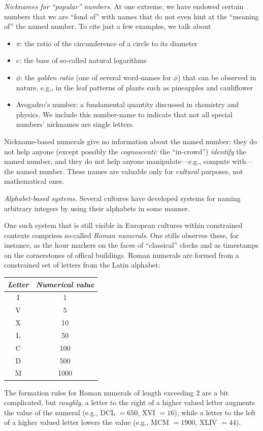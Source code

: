 \noindent
{\it Nicknames for ``popular'' numbers}.
%
At one extreme, we have endowed certain numbers that we are ``fond
of'' with names that do not even hint at the ``meaning of'' the named
number.  To cite just a few examples, we talk about
\begin{itemize}
\item
$\pi$: the ratio of the circumference of a circle to its diameter
\item
$e$: the base of so-called natural logarithms
\item
$\phi$: the {\it golden ratio} (one of several word-names for $\phi$)
  that can be observed in nature, e.g., in the leaf patterns of plants
  such as pineapples and cauliflower
\item
Avogadro's number: a fundamental quantity discussed in chemistry and
physics.  We include this number-name to indicate that not all
special numbers' nicknames are single letters.
\end{itemize}
Nickname-based numerals give no information about the named number:
they do not help anyone (except possibly the {\it cognoscenti:} the
``in-crowd'') {\em identify} the named number, and they do not help
anyone manipulate---e.g., compute with---the named number.  These
names are valuable only for {\em cultural} purposes, not mathematical
ones.

\noindent
{\it Alphabet-based systems.}
%
Several cultures have developed systems for naming arbitrary integers
by using their alphabets in some manner.

One such system that is still visible in European cultures within
constrained contexts comprises so-called {\it Roman numerals}.  One
stills observes these, for instance, as the hour markers on the faces
of ``classical'' clocks and as timestamps on the cornerstones of
offical buildings.  Roman numerals are formed from a constrained set
of letters from the Latin alphabet:

\begin{tabular}{c|c}
{\it Letter} & {\it Numerical value} \\
\hline
I  & 1 \\
V  & 5 \\
X  & 10 \\
L  & 50 \\
C  & 100 \\
D  & 500 \\
M  & 1000
\end{tabular}

\noindent
The formation rules for Roman numerals of length exceeding $2$ are a
bit complicated, but {\em roughly}, a letter to the right of a higher
valued letter augments the value of the numeral (e.g., DCL $=650$, XVI
$=16$), while a letter to the left of a higher valued letter lowers
the value (e.g., MCM $=1900$, XLIV $=44$).

